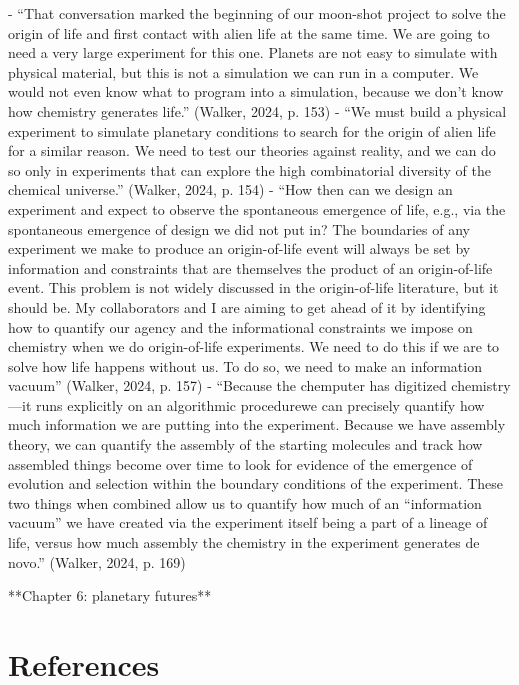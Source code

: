 \documentclass[11pt]{article}
\begin{document}
\begin{markdown}
- “That conversation marked the beginning of our moon-shot project to solve the origin of life and first contact with alien life at the same time. We are going to need a very large experiment for this one. Planets are not easy to simulate with physical material, but this is not a simulation we can run in a computer. We would not even know what to program into a simulation, because we don’t know how chemistry generates life.” (Walker, 2024, p. 153)
- “We must build a physical experiment to simulate planetary conditions to search for the origin of alien life for a similar reason. We need to test our theories against reality, and we can do so only in experiments that can explore the high combinatorial diversity of the chemical universe.” (Walker, 2024, p. 154)
- “How then can we design an experiment and expect to observe the spontaneous emergence of life, e.g., via the spontaneous emergence of design we did not put in? The boundaries of any experiment we make to produce an origin-of-life event will always be set by information and constraints that are themselves the product of an origin-of-life event. This problem is not widely discussed in the origin-of-life literature, but it should be. My collaborators and I are aiming to get ahead of it by identifying how to quantify our agency and the informational constraints we impose on chemistry when we do origin-of-life experiments. We need to do this if we are to solve how life happens without us. To do so, we need to make an information vacuum” (Walker, 2024, p. 157)
- “Because the chemputer has digitized chemistry—it runs explicitly on an algorithmic procedurewe can precisely quantify how much information we are putting into the experiment. Because we have assembly theory, we can quantify the assembly of the starting molecules and track how assembled things become over time to look for evidence of the emergence of evolution and selection within the boundary conditions of the experiment. These two things when combined allow us to quantify how much of an “information vacuum” we have created via the experiment itself being a part of a lineage of life, versus how much assembly the chemistry in the experiment generates de novo.” (Walker, 2024, p. 169)

**Chapter 6: planetary futures**

\end{markdown}

\clearpage

\section{References}
%
\footnotesize
\setlength{\bibsep}{0.0pt}

\end{document}
